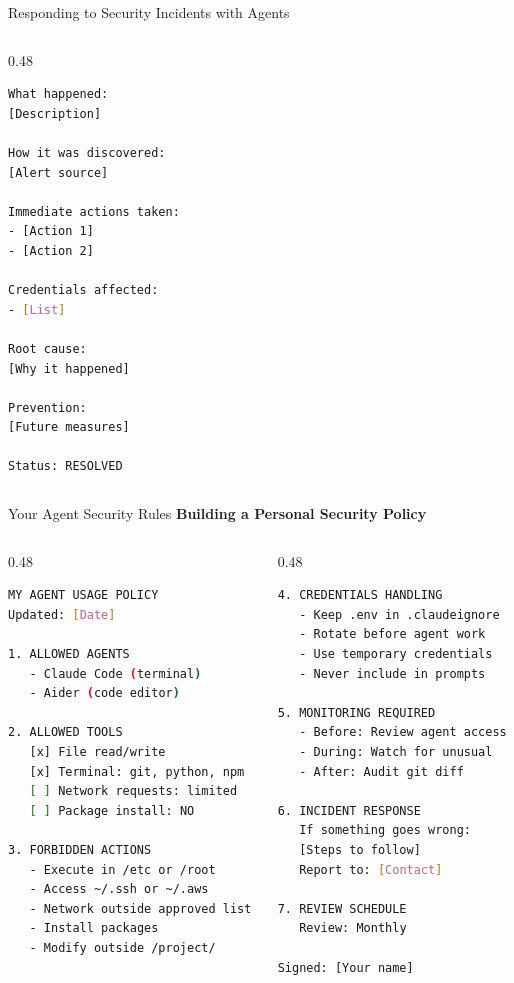 \documentclass[aspectratio=169,11pt]{beamer}
\begin{document}
\begin{frame}[fragile]{Responding to Security Incidents with Agents}
\begin{columns}[T]
\begin{column}{0.48\textwidth}
\begin{lstlisting}[language=Bash]
What happened:
[Description]

How it was discovered:
[Alert source]

Immediate actions taken:
- [Action 1]
- [Action 2]

Credentials affected:
- [List]

Root cause:
[Why it happened]

Prevention:
[Future measures]

Status: RESOLVED
            \end{lstlisting}
        \end{column}
    \end{columns}
\end{frame}

\begin{frame}[fragile]{Your Agent Security Rules}
    \textbf{Building a Personal Security Policy}

    \begin{columns}[T]
        \begin{column}{0.48\textwidth}
            \begin{lstlisting}[language=Bash]
MY AGENT USAGE POLICY
Updated: [Date]

1. ALLOWED AGENTS
   - Claude Code (terminal)
   - Aider (code editor)

2. ALLOWED TOOLS
   [x] File read/write
   [x] Terminal: git, python, npm
   [ ] Network requests: limited
   [ ] Package install: NO

3. FORBIDDEN ACTIONS
   - Execute in /etc or /root
   - Access ~/.ssh or ~/.aws
   - Network outside approved list
   - Install packages
   - Modify outside /project/
            \end{lstlisting}
        \end{column}
        \begin{column}{0.48\textwidth}
            \begin{lstlisting}[language=Bash]
4. CREDENTIALS HANDLING
   - Keep .env in .claudeignore
   - Rotate before agent work
   - Use temporary credentials
   - Never include in prompts

5. MONITORING REQUIRED
   - Before: Review agent access
   - During: Watch for unusual
   - After: Audit git diff

6. INCIDENT RESPONSE
   If something goes wrong:
   [Steps to follow]
   Report to: [Contact]

7. REVIEW SCHEDULE
   Review: Monthly

Signed: [Your name]
            \end{lstlisting}
        \end{column}
    \end{columns}
\end{frame}
\end{document}
